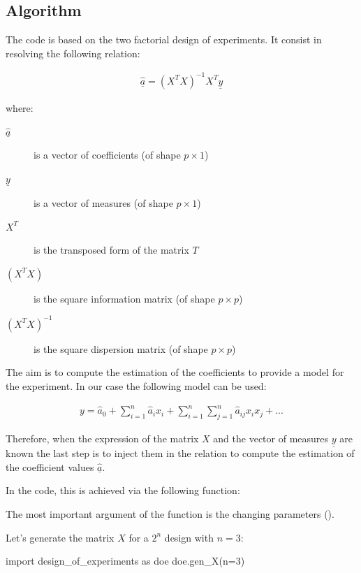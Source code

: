 \documentclass[english, 12 pt, openany, oneside]{book}
\begin{document}
\subsection{Algorithm}
The code is based on the two factorial design of experiments. It consist in resolving the following relation:

\begin{align*}
\hat{\underline{a}} = \left(X^T X\right)^{-1} X^T \underline{y}
\end{align*}

\noindent where: 

\begin{description}
\item[$\hat{\underline{a}}$] is a vector of coefficients (of shape $p\times 1$)
\item[$\underline{y}$] is a vector of measures (of shape $p\times 1$)
\item[$X^T$] is the transposed form of the matrix $T$
\item[$\left(X^T X\right)$] is the square information matrix (of shape $p\times p$)
\item[$\left(X^T X\right)^{-1}$] is the square dispersion matrix (of shape $p\times p$)
\end{description}

The aim is to compute the estimation of the coefficients to provide a model for the experiment. In our case the following model can be used:

\begin{align*}
y = \hat{a}_0 + \sum^n_{i=1} \hat{a}_i x_i + \sum^n_{i=1} \sum^n_{j=1} \hat{a}_{ij} x_i {x}_j + ...
\end{align*}

Therefore, when the expression of the matrix ${X}$ and the vector of measures $\underline{y}$ are known the last step is to inject them in the relation to compute the estimation of the coefficient values $\hat{\underline{a}}$. 

In the code, this is achieved via the following function:\\ 

The most important argument of the function is the changing parameters ().

Let's generate the matrix $X$ for a $2^n$ design with $n=3$:

\begin{pyconsole}[][breaklines]
import design_of_experiments as doe
doe.gen_X(n=3)
\end{pyconsole}
\end{document}
